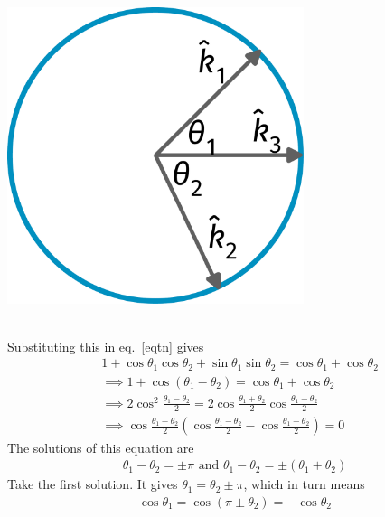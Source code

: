 \documentclass[12pt]{article}
\begin{document}
\begin{minipage}{0.35\textwidth}
	\centering
	\includegraphics[width=0.65\textwidth]{./figures/term2.pdf}
\end{minipage}\\
Substituting this in eq.~\ref{eqtn} gives
\begin{equation}\begin{aligned}
 &1 + \cos\theta_1\cos\theta_2 + \sin\theta_1\sin\theta_2= \cos\theta_1 + \cos\theta_2\\
 &\implies  1 + \cos\left(\theta_1 - \theta_2\right) = \cos\theta_1 + \cos\theta_2\\
 &\implies  2\cos^2\frac{\theta_1 - \theta_2}{2} = 2\cos\frac{\theta_1 + \theta_2}{2}\cos\frac{\theta_1 - \theta_2}{2}\\
 &\implies  \cos\frac{\theta_1 - \theta_2}{2}\left(\cos\frac{\theta_1 - \theta_2}{2} - \cos\frac{\theta_1 + \theta_2}{2}\right) =0
\end{aligned}\end{equation}
The solutions of this equation are
\begin{equation}\begin{aligned}
	\theta_1 - \theta_2 = \pm \pi \text{ and } \theta_1 - \theta_2 = \pm\left(\theta_1 + \theta_2\right)
\end{aligned}\end{equation}
Take the first solution. It gives \(\theta_1 = \theta_2 \pm \pi\), which in turn means
\begin{equation}\begin{aligned}
\label{cos}
\cos \theta_1 = \cos \left(\pi \pm \theta_2\right) = -\cos \theta_2
\end{aligned}\end{equation}
\end{document}
